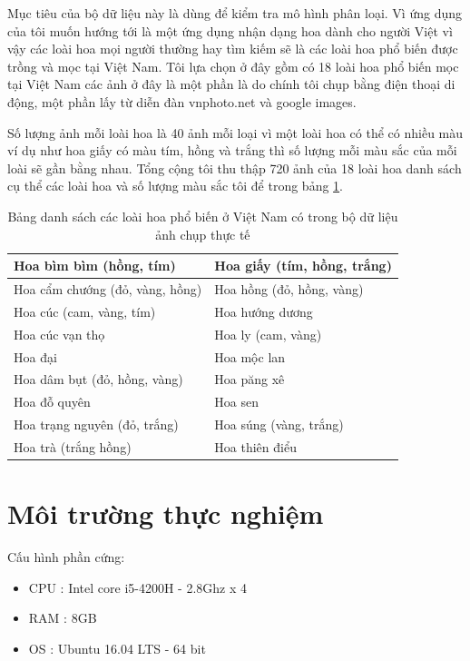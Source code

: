 \documentclass[12pt]{report}
\begin{document}
		Mục tiêu của bộ dữ liệu này là dùng để kiểm tra mô hình phân loại. 
		Vì ứng dụng của tôi muốn hướng tới là một ứng dụng nhận dạng hoa dành 
		cho người Việt vì vậy các loài hoa mọi người thường hay tìm kiếm sẽ là 
		các loài hoa phổ biến được trồng và mọc tại Việt Nam. Tôi lựa chọn ở đây gồm có 18 loài hoa phổ biến mọc tại Việt Nam các ảnh ở đây là một phần là do chính tôi chụp bằng điện thoại di động, một phần lấy từ diễn đàn vnphoto.net và google images. 
		
		Số lượng ảnh mỗi loài hoa là 40 ảnh mỗi loại vì một loài hoa có thể có nhiều màu ví dụ như hoa giấy có màu tím, hồng và trắng thì số lượng mỗi màu sắc của mỗi loài sẽ gần bằng nhau. Tổng cộng tôi thu thập 720 ảnh của 18 loài hoa danh sách cụ thể các loài hoa và số lượng màu sắc tôi để trong 
		bảng \ref{tbl:table danh sach hoa vn}.
								
								
		\begin{table}[h]
			\centering
			\caption{Bảng danh sách các loài hoa phổ biến ở Việt Nam có trong bộ dữ liệu ảnh chụp thực tế}
			\label{tbl:table danh sach hoa vn}
			\begin{tabular}{|l|l|}
				\hline
				Hoa bìm bìm (hồng, tím)               & Hoa giấy (tím, hồng, trắng) \\ \hline
				Hoa cẩm chướng (đỏ, vàng, hồng) & Hoa hồng (đỏ, hồng, vàng)  \\ \hline
				Hoa cúc (cam, vàng, tím)                & Hoa hướng dương               \\ \hline       
				Hoa cúc vạn thọ                       & Hoa ly (cam, vàng)                \\ \hline     
				Hoa đại                                 & Hoa mộc lan                      \\ \hline       
				Hoa dâm bụt (đỏ, hồng, vàng)      & Hoa păng xê                      \\ \hline 
				Hoa đỗ quyên                           & Hoa sen                            \\ \hline      
				Hoa trạng nguyên (đỏ, trắng)       & Hoa súng (vàng, trắng)         \\ \hline
				Hoa trà (trắng hồng)                  & Hoa thiên điểu                 \\ \hline   			
			\end{tabular}
		\end{table}
				
		\section{Môi trường thực nghiệm}
		Cấu hình phần cứng:
		\begin{itemize}
			\item CPU	: Intel core i5-4200H - 2.8Ghz x 4
			\item RAM	: 8GB
			\item OS	: Ubuntu 16.04 LTS - 64 bit
		\end{itemize}
				
\end{document}
